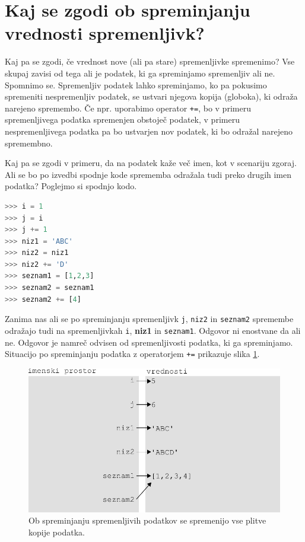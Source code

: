 \section{Kaj se zgodi ob spreminjanju vrednosti spremenljivk?}
Kaj pa se zgodi, če vrednost nove (ali pa stare) spremenljivke spremenimo? Vse skupaj zavisi od tega ali je podatek, ki ga spreminjamo spremenljiv ali ne. Spomnimo se. Spremenljiv podatek lahko spreminjamo, ko pa pokusimo spremeniti nespremenljiv podatek, se ustvari njegova kopija (globoka), ki odraža narejeno spremembo. Če npr. uporabimo operator \texttt{+=}, bo v primeru spremenljivega podatka spremenjen obstoječ podatek, v primeru nespremenljivega podatka pa bo ustvarjen nov podatek, ki bo odražal narejeno spremembno. 

Kaj pa se zgodi v primeru, da na podatek kaže več imen, kot v scenariju zgoraj. Ali se bo po izvedbi spodnje kode sprememba odražala tudi preko drugih imen podatka? Poglejmo si spodnjo kodo.
\begin{lstlisting}[language=Python, showstringspaces=false]
>>> i = 1
>>> j = i
>>> j += 1
>>> niz1 = 'ABC'
>>> niz2 = niz1
>>> niz2 += 'D'
>>> seznam1 = [1,2,3]
>>> seznam2 = seznam1
>>> seznam2 += [4]
\end{lstlisting}
Zanima nas ali se po spreminjanju spremenljivk \texttt{j}, \texttt{niz2} in \texttt{seznam2} spremembe odražajo tudi na spremenljivkah \texttt{i}, \textbf{niz1} in \texttt{seznam1}. Odgovor ni enostvane da ali ne. Odgovor je namreč odvisen od spremenljivosti podatka, ki ga spreminjamo. Situacijo po spreminjanju podatka z operatorjem \texttt{+=} prikazuje slika \ref{img:spremenljivost_3}.
\begin{figure}
    \centering
    \includegraphics[width=\linewidth]{img/spremenljivost_3.pdf}
    \caption{Ob spreminjanju spremenljivih podatkov se spremenijo vse plitve kopije podatka.}
    \label{img:spremenljivost_3}
\end{figure}
